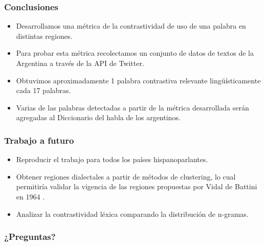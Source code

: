 \begin{frame}[t]\frametitle{Conclusiones}
    
    \begin{itemize}
        \item Desarrollamos una métrica de la contrastividad de uso de una palabra en distintas regiones.
        \item Para probar esta métrica recolectamos un conjunto de datos de textos de la Argentina a través de la API de Twitter.
        \item Obtuvimos aproximadamente 1 palabra contrastiva relevante lingüísticamente cada 17 palabras.
        \item Varias de las palabras detectadas a partir de la métrica desarrollada serán agregadas al Diccionario del habla de los argentinos.
    \end{itemize}

\end{frame}

\begin{frame}[t]\frametitle{Trabajo a futuro}
    
    \begin{itemize}
        \item Reproducir el trabajo para todos los países hispanoparlantes.
        \item Obtener regiones dialectales a partir de métodos de clustering, lo cual permitiría validar la vigencia de las regiones propuestas por Vidal de Battini en 1964 \cite{vidal1964espanol}.
        \item Analizar la contrastividad léxica comparando la distribución de n-gramas.
    \end{itemize}

\end{frame}

\begin{frame}[t]\frametitle{¿Preguntas?}
    
\end{frame}
